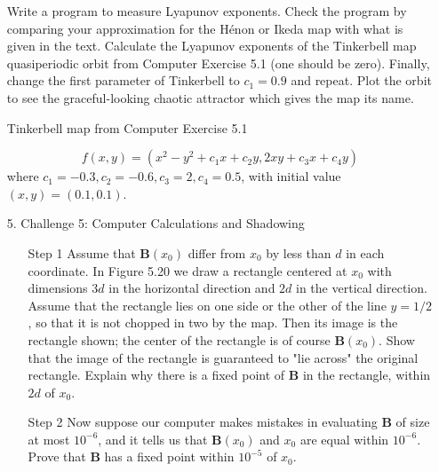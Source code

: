 \documentclass[12pt,letterpaper,reqno]{amsart}
\begin{document}
\begin{enumerate}
Write a program to measure Lyapunov exponents. Check the program by comparing your approximation for the Hénon or Ikeda map with what is given in the text. Calculate the Lyapunov exponents of the Tinkerbell map quasiperiodic orbit from Computer Exercise 5.1 (one should be zero). Finally, change the first parameter of Tinkerbell to $c_1 = 0.9$ and repeat. Plot the orbit to see the graceful-looking chaotic attractor which gives the map its name.

\begin{center}
    Tinkerbell map from Computer Exercise 5.1
\end{center}
$$f ( x , y ) = \left( x ^ { 2 } - y ^ { 2 } + c _ { 1 } x + c _ { 2 } y , 2 x y + c _ { 3 } x + c _ { 4 } y \right)$$
where $c _ { 1 } = - 0.3 , c _ { 2 } = - 0.6 , c _ { 3 } = 2 , c _ { 4 } = 0.5$, with initial value $(x,y) = (0.1, 0.1)$.

\begin{flushleft}

\end{flushleft}

\newpage
\item[5.] Challenge 5: Computer Calculations and Shadowing\newline

\begin{enumerate}
    \item[Step 1] Assume that \textbf{B}$(x_0)$ differ from $x_0$ by less than $d$ in each coordinate. In Figure 5.20 we draw a rectangle centered at $x_0$ with dimensions $3d$ in the horizontal direction and $2d$ in the vertical direction. Assume that the rectangle lies on one side or the other of the line $y = 1/2$, so that it is not chopped in two by the map. Then its image is the rectangle shown; the center of the rectangle is of course \textbf{B}$(x_0)$. Show that the image of the rectangle is guaranteed to "lie across" the original rectangle. Explain why there is a fixed point of \textbf{B} in the rectangle, within $2d$ of $x_0$.
    \begin{flushleft}
    
    \end{flushleft}
    
    \item[Step 2] Now suppose our computer makes mistakes in evaluating \textbf{B} of size at most $10^{-6}$, and it tells us that \textbf{B}$(x_0)$ and $x_0$ are equal within $10^{-6}$. Prove that \textbf{B} has a fixed point within $10^{-5}$ of $x_0$.
    \begin{flushleft}
    

\end{flushleft}
\end{enumerate}
\end{enumerate}
\end{document}
